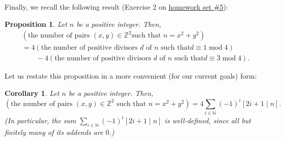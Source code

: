 \documentclass[paper=a4, fontsize=12pt]{scrartcl}%
\let\sumnonlimits\sum
\renewcommand{\sum}{\sumnonlimits\limits}
\theoremstyle{plainsl}
\newtheorem{proposition}[theorem]{Proposition}
\newtheorem{corollary}[theorem]{Corollary}
\theoremstyle{definition}
\theoremstyle{remark}
\begin{document}
Finally, we recall the following result (Exercise 2 on
\href{http://www.cip.ifi.lmu.de/~grinberg/t/19s/hw5s.pdf}{homework set \#5}):

\begin{proposition}
\label{prop.Z[i].xx+yy.jac-num}Let $n$ be a positive integer. Then,%
\begin{align*}
&  \left(  \text{the number of pairs $\left(  x,y\right)  \in\mathbb{Z}^{2}$
such that $n=x^{2}+y^{2}$}\right) \\
&  =4\left(  \text{the number of positive divisors $d$ of $n$ such that
$d\equiv1\operatorname{mod}4$}\right) \\
&  \qquad-4\left(  \text{the number of positive divisors $d$ of $n$ such that
$d\equiv3\operatorname{mod}4$}\right)  .
\end{align*}

\end{proposition}

Let us restate this proposition in a more convenient (for our current goals) form:

\begin{corollary}
\label{cor.Z[i].xx+yy.jac-num-sum}Let $n$ be a positive integer. Then,%
\[
\left(  \text{the number of pairs $\left(  x,y\right)  \in\mathbb{Z}^{2}$ such
that $n=x^{2}+y^{2}$}\right)  =4\sum_{i\in\mathbb{N}}\left(  -1\right)
^{i}\left[  2i+1\mid n\right]  .
\]
(In particular, the sum $\sum_{i\in\mathbb{N}}\left(  -1\right)  ^{i}\left[
2i+1\mid n\right]  $ is well-defined, since all but finitely many of its
addends are $0$.)
\end{corollary}
\end{document}
